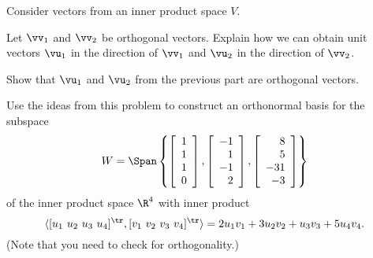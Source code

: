 \begin{activity} \label{act:6_c_orthon_basis} Consider vectors from an inner product space $V$.
	\ba
	\item Let $\vv_1$ and $\vv_2$ be orthogonal vectors. Explain how we can obtain unit vectors $\vu_1$ in the direction of $\vv_1$ and $\vu_2$ in the direction of $\vv_2$.
	
	
	
	\item Show that $\vu_1$ and $\vu_2$ from the previous part are orthogonal vectors.
	
	
	
	\item Use the ideas from this problem to construct an orthonormal basis for the subspace
\[W = \Span\left\{\left[ \begin{array}{c} 1 \\ 1 \\ 1 \\ 0 \end{array} \right], \left[ \begin{array}{r} -1 \\ 1 \\ -1 \\ 2\end{array} \right], \left[ \begin{array}{r} 8 \\ 5 \\ -31 \\ -3 \end{array} \right]\right\}\]
of the inner product space $\R^4$ with inner product 
\[\langle [u_1 \ u_2 \ u_3 \ u_4]^\tr, [v_1 \ v_2 \ v_3 \ v_4]^\tr \rangle = 2u_1v_1+3u_2v_2+u_3v_3+5u_4v_4.\]
(Note that you need to check for orthogonality.)	
	
	
	\ea
\end{activity}


